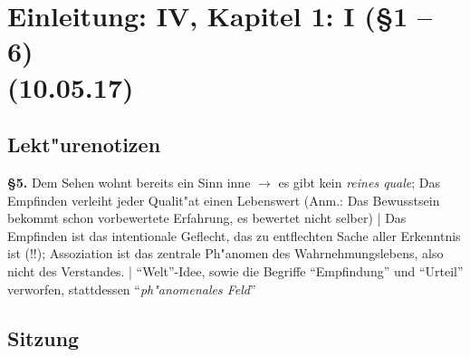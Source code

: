 \documentclass[emulatestandardclasses]{scrartcl}
\begin{document}
\section{Einleitung: IV, Kapitel 1: I (\S 1 -- 6)\\(10.05.17)}

\subsection{Lekt"urenotizen}

\textbf{\S 5.} Dem Sehen wohnt bereits ein Sinn inne $\rightarrow$ es gibt kein \emph{reines quale}; Das Empfinden verleiht jeder Qualit"at einen Lebenswert (Anm.: Das Bewusstsein bekommt schon vorbewertete Erfahrung, es bewertet nicht selber) | Das Empfinden ist das intentionale Geflecht, das zu entflechten Sache aller Erkenntnis ist (!!); Assoziation ist das zentrale Ph"anomen des Wahrnehmungslebens, also nicht des Verstandes. | "`Welt"'-Idee, sowie die Begriffe "`Empfindung"' und "`Urteil"' verworfen, stattdessen "`\emph{ph"anomenales Feld}"'


\subsection{Sitzung}
\end{document}
